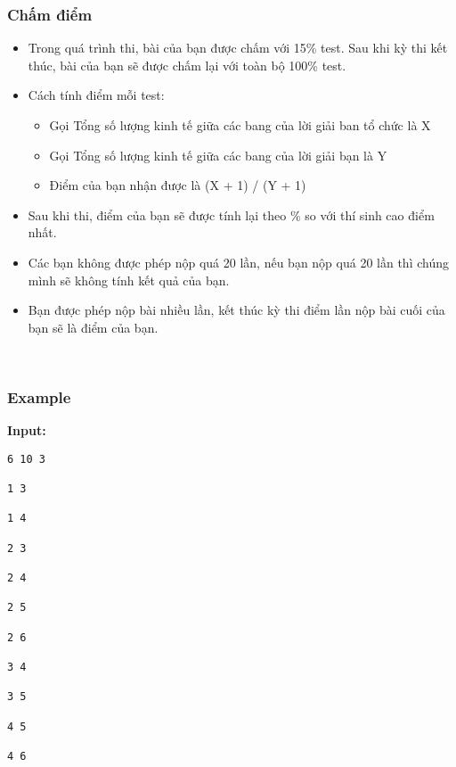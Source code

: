 \subsubsection{Chấm điểm}
\begin{itemize}
	\item Trong quá trình thi, bài của bạn được chấm với 15\% test. Sau khi kỳ  thi kết thúc, bài của bạn sẽ được chấm lại với toàn bộ 100\% test.
	\item Cách tính điểm mỗi test:        

 
\begin{itemize}
	\item Gọi Tổng số lượng kinh tế giữa các bang của lời giải ban tổ chức là X
\end{itemize}
\begin{itemize}
	\item Gọi Tổng số lượng kinh tế giữa các bang của lời giải bạn là Y
	\item Điểm của bạn nhận được là (X + 1) / (Y + 1)
\end{itemize}
	\item Sau khi thi, điểm của bạn sẽ được tính lại theo \% so với thí sinh cao điểm nhất.
	\item Các bạn không được phép nộp quá 20 lần, nếu bạn nộp quá 20 lần thì chúng mình sẽ không tính kết quả của bạn.
	\item Bạn được phép nộp bài nhiều lần, kết thúc kỳ thi điểm lần nộp bài cuối của bạn sẽ là điểm của bạn.
\end{itemize}

 
\begin{itemize}
\end{itemize}
\begin{itemize}
\end{itemize}

\subsubsection{Example}

\textbf{Input:}
\begin{verbatim}
6 10 3

1 3

1 4

2 3

2 4

2 5

2 6

3 4

3 5

4 5

4 6\end{verbatim}

